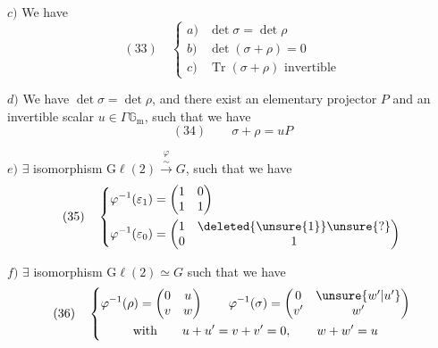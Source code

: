 $c)$ We have \deleted{$\det\sigma=\det\rho$}
\[
(33)\quad\left\{\begin{array}{ll}
a)&\det\sigma=\det\rho\\
b)&\det(\sigma+\rho)=0\\
c)&\operatorname{Tr}(\sigma+\rho)\text{ invertible}
\end{array}\right.
\]

$d)$ We have $\det\sigma=\det\rho$, and there exist an elementary projector $P$ and an invertible scalar $u\in\Gamma\mathbb G_{\mathrm m}$, such that we have
\[
(34)\qquad \sigma+\rho=uP
\]




$e)$ $\exists$ isomorphism $\mathrm{G}\ell(2)\overset{\varphi}{\xrightarrow{\sim}}G$,  such that we have
\[
(35)\quad\left\{\begin{aligned}
\varphi^{-1}(\varepsilon_1)&=\begin{pmatrix}1&0\\1&1\end{pmatrix}\\
\varphi^{-1}(\varepsilon_0)&=\begin{pmatrix}1&\deleted{\unsure{1}}\unsure{?}\\0&1\end{pmatrix}
\end{aligned}\right.
\]

$f)$ $\exists$ isomorphism $\mathrm{G}\ell(2)\simeq G$ such that we have
\[
(36)\quad\left\{\begin{gathered}
\varphi^{-1}(\rho)=\begin{pmatrix}0&u\\v&w\end{pmatrix}\qquad
\varphi^{-1}(\sigma)=\begin{pmatrix}0&\unsure{w'|u'}\\v'&w'\end{pmatrix}\\
\text{with}\qquad u+u'=v+v'=0,\qquad w+w'=u
\end{gathered}\right.
\]

